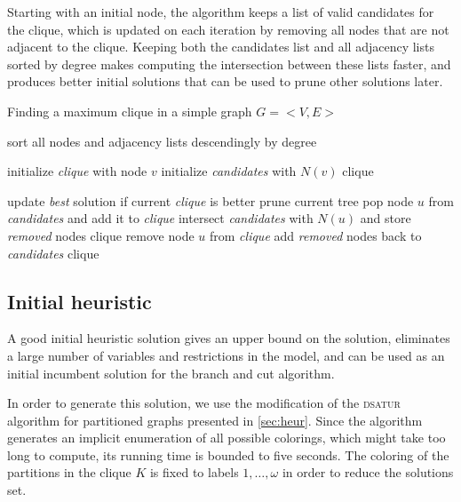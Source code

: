 Starting with an initial node, the algorithm keeps a list of valid candidates for the clique, which is updated on each iteration by removing all nodes that are not adjacent to the clique. Keeping both the candidates list and all adjacency lists sorted by degree makes computing the intersection between these lists faster, and produces better initial solutions that can be used to prune other solutions later.

\begin{algorithm}
\caption{Finding a maximum clique in a simple graph $G=<V,E>$}
\label{alg:gpclique}

\begin{algorithmic}

\STATE sort all nodes and adjacency lists descendingly by degree

	\STATE initialize \textit{clique} with node $v$
	\STATE initialize \textit{candidates} with $N(v)$
	\CALL clique 
\ENDFOR

		\STATE update \textit{best} solution if current \textit{clique} is better
		\STATE prune current tree
	\ELSE
		\STATE pop node $u$ from \textit{candidates} and add it to \textit{clique}
		\STATE intersect \textit{candidates} with $N(u)$ and store \textit{removed} nodes
		\CALL clique
		\STATE remove node $u$ from \textit{clique}
		\STATE add \textit{removed} nodes back to \textit{candidates} 
		\CALL clique
	\ENDIF
\ENDPROC

\end{algorithmic}
\end{algorithm} 

\subsection{Initial heuristic}

A good initial heuristic solution gives an upper bound on the solution, eliminates a large number of variables and restrictions in the model, and can be used as an initial incumbent solution for the branch and cut algorithm. 

In order to generate this solution, we use the modification of the \textsc{dsatur} algorithm for partitioned graphs presented in \ref{sec:heur}. Since the algorithm generates an implicit enumeration of all possible colorings, which might take too long to compute, its running time is bounded to five seconds. The coloring of the partitions in the clique $K$ is fixed to labels $1, \ldots, \omega$ in order to reduce the solutions set.


